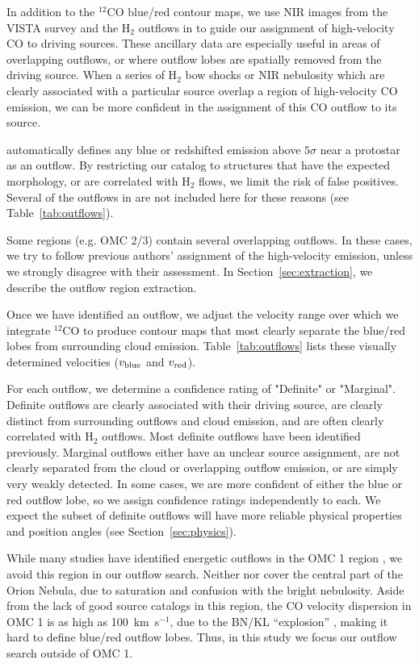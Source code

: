 \documentclass[twocolumn]{aastex63}
\newcommand{\co}[1][]{\ensuremath{^{#1}}CO}
\begin{document}
In addition to the \co[12]{} blue/red contour maps, we use NIR images from the VISTA survey \citep{Meingast16} and the H$_2$ outflows in \citet{Davis09} to guide our assignment of high-velocity CO to driving sources. These ancillary data are especially useful in areas of overlapping outflows, or where outflow lobes are spatially removed from the driving source. When a series of H$_2$ bow shocks or NIR nebulosity which are clearly associated with a particular source overlap a region of high-velocity CO emission, we can be more confident in the assignment of this CO outflow to its source.

\citet{Tanabe:submitted} automatically defines any blue or redshifted emission above $5\sigma$ near a protostar as an outflow. By restricting our catalog to structures that have the expected morphology, or are correlated with H$_2$ flows, we limit the risk of false positives. Several of the outflows in \citet{Tanabe:submitted} are not included here for these reasons (see Table~\ref{tab:outflows}).

Some regions (e.g. OMC 2/3) contain several overlapping outflows. In these cases, we try to follow previous authors' assignment of the high-velocity emission, unless we strongly disagree with their assessment. In Section~\ref{sec:extraction}, we describe the outflow region extraction.

Once we have identified an outflow, we adjust the velocity range over which we integrate \co[12]{} to produce contour maps that most clearly separate the blue/red lobes from surrounding cloud emission. Table~\ref{tab:outflows} lists these visually determined velocities ($v_{\rm blue}$ and $v_{\rm red}$).

For each outflow, we determine a confidence rating of "Definite" or "Marginal". Definite outflows are clearly associated with their driving source, are clearly distinct from surrounding outflows and cloud emission, and are often clearly correlated with H$_2$ outflows. Most definite outflows have been identified previously. Marginal outflows either have an unclear source assignment, are not clearly separated from the cloud or overlapping outflow emission, or are simply very weakly detected. In some cases, we are more confident of either the blue or red outflow lobe, so we assign confidence ratings independently to each. We expect the subset of definite outflows will have more reliable physical properties and position angles (see Section~\ref{sec:physics}).

While many studies have identified energetic outflows in the OMC 1 region \citep[e.g.][]{Schmid-Burgk90,Zapata05,Teixeira16,Bally17}, we avoid this region in our outflow search. Neither \citet{Davis09} nor \citet{Furlan16} cover the central part of the Orion Nebula, due to saturation and confusion with the bright nebulosity. Aside from the lack of good source catalogs in this region, the CO velocity dispersion in OMC 1 is as high as 100~km~s$^{-1}$, due to the BN/KL ``explosion'' \citep{Bally17}, making it hard to define blue/red outflow lobes. Thus, in this study we focus our outflow search outside of OMC 1. 
\end{document}
